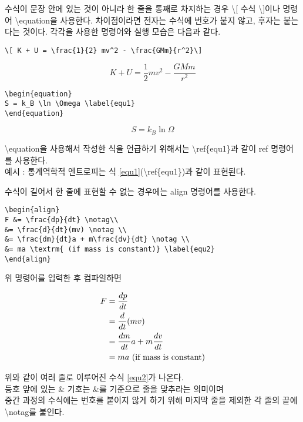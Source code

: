 \vskip 2pc

\noindent 수식이 문장 안에 있는 것이 아니라 한 줄을 통째로 차지하는 경우 \textbackslash[ 수식 \textbackslash]이나 명령어 \textbackslash equation을 사용한다. 차이점이라면 전자는 수식에 번호가 붙지 않고, 후자는 붙는다는 것이다. 각각을 사용한 명령어와 실행 모습은 다음과 같다.

\begin{lstlisting}
\[ K + U = \frac{1}{2} mv^2 - \frac{GMm}{r^2}\]
\end{lstlisting}
\[ K + U = \frac{1}{2} mv^2 - \frac{GMm}{r^2}\]

\vskip 2pc

\noindent \begin{lstlisting}
\begin{equation}
S = k_B \ln \Omega \label{equ1}
\end{equation}
\end{lstlisting}
\begin{equation}
	S = k_B \ln \Omega \label{equ1}
\end{equation}

\noindent \textbackslash equation을 사용해서 작성한 식을 언급하기 위해서는 \textbackslash ref\{equ1\}과 같이 ref 명령어를 사용한다. \\
예시 : 통계역학적 엔트로피는 식 \ref{equ1}(\textbackslash ref\{equ1\})과 같이 표현된다.

\vskip 2pc

\noindent 수식이 길어서 한 줄에 표현할 수 없는 경우에는 align 명령어를 사용한다.
\begin{lstlisting}
\begin{align}
F &= \frac{dp}{dt} \notag\\
&= \frac{d}{dt}(mv) \notag \\
&= \frac{dm}{dt}a + m\frac{dv}{dt} \notag \\
&= ma \textrm{ (if mass is constant)} \label{equ2}
\end{align}
\end{lstlisting}
위 명령어를 입력한 후 컴파일하면

\begin{align}
F &= \frac{dp}{dt} \notag\\
&= \frac{d}{dt}(mv) \notag \\
&= \frac{dm}{dt}a + m\frac{dv}{dt} \notag \\
&= ma \textrm{ (if mass is constant)} \label{equ2}
\end{align}

\noindent 위와 같이 여러 줄로 이루어진 수식 \ref{equ2}가 나온다. \\
등호 앞에 있는 \& 기호는 \&를 기준으로 줄을 맞추라는 의미이며 \\
중간 과정의 수식에는 번호를 붙이지 않게 하기 위해 마지막 줄을 제외한 각 줄의 끝에 \textbackslash notag를 붙인다.\\